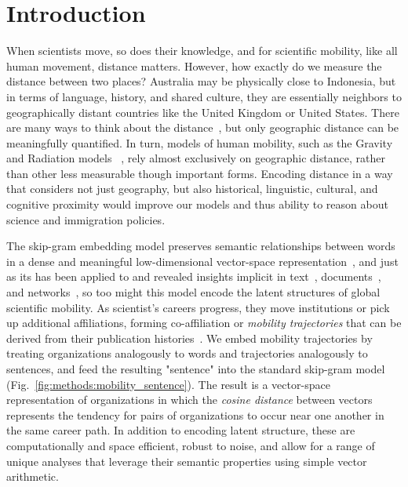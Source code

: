 \documentclass[12pt]{article} %
\begin{document}
%
%
\section{Introduction}\label{sec:introduction} %


When scientists move, so does their knowledge, and for scientific mobility, like all human movement, distance matters. 
However, how exactly do we measure the distance between two places?
Australia may be physically close to Indonesia, but in terms of language, history, and shared culture, they are essentially neighbors to geographically distant countries like the United Kingdom or United States. 
There are many ways to think about the distance~\autocite{boschma2005proximity}, but only geographic distance can be meaningfully quantified. 
In turn, models of human mobility, such as the Gravity~\autocite{zipf1946gravity} and Radiation models ~\autocite{simini2012universal}, rely almost exclusively on geographic distance, rather than other less measurable though important forms. 
Encoding distance in a way that considers not just geography, but also historical, linguistic, cultural, and cognitive proximity would improve our models and thus ability to reason about science and immigration policies. 

The skip-gram embedding model preserves semantic relationships between words in a dense and meaningful low-dimensional vector-space representation~\cite{mikolov2013word2vec}, and just as its has been applied to and revealed insights implicit in text~\cite{linzhuo2020hyperbolic, tshitoyan2019mat2vec, garg2018gender, kozlowski2018geometry}, documents~\autocite{le2014doc2vec, nakandala2016twitch}, and networks~\autocite{perozzi2014deepwalk, grover2016node2vec}, so too might this model encode the latent structures of global scientific mobility. 
As scientist's careers progress, they move institutions or pick up additional affiliations, forming co-affiliation or \textit{mobility trajectories} that can be derived from their publication histories~\autocite{robinson2019mobility, sugimoto2017mostimpact}. 
We embed mobility trajectories by treating organizations analogously to words and trajectories analogously to sentences, and feed the resulting "sentence" into the standard skip-gram model (Fig.~\ref{fig:methods:mobility_sentence}).
The result is a vector-space representation of organizations in which the \textit{cosine distance} between vectors represents the tendency for pairs of organizations to occur near one another in the same career path. 
In addition to encoding latent structure, these  are computationally and space efficient, robust to noise, and allow for a range of unique analyses that leverage their semantic properties using simple vector arithmetic. 
\end{document}
